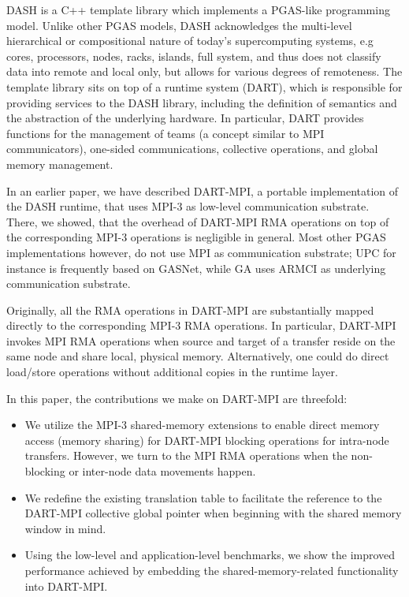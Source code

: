 \documentclass{llncs}
\newcommand{\MPI}[1]{\mbox{MPI-#1}\xspace}
\begin{document}
DASH\cite{dash} is a C++ template library which implements a PGAS-like
programming model. Unlike other PGAS models, DASH acknowledges the
multi-level hierarchical or compositional nature of today's     
supercomputing systems, e.g cores, processors, nodes, racks, islands,
full system, and thus does not classify data into remote and local
only, but allows for various degrees of remoteness. The template
library sits on top of a runtime system (DART), which is responsible
for providing services to the DASH library, including the definition
of semantics and the abstraction of the underlying hardware. In
particular, DART provides functions for the management of teams
(a concept similar to  MPI communicators),
one-sided communications, collective operations,
and global memory management. 

In an earlier paper\cite{dart-mpi}, we have described DART-MPI, a portable
implementation of the DASH runtime, that uses \MPI3 as low-level
communication substrate. There, we showed, that the overhead of
DART-MPI RMA operations on top of the corresponding MPI-3 operations
is negligible in general. Most other PGAS
implementations however, do not use MPI as communication substrate;
UPC\cite{upc} for instance is frequently based on
GASNet\cite{techgasnet}, while GA\cite{ga} uses ARMCI\cite{armci} as
underlying communication substrate.

Originally, all the RMA operations in DART-MPI are substantially mapped
directly to the corresponding \MPI3 RMA operations. In particular,
DART-MPI invokes MPI RMA operations when source and target of a
transfer reside on the same node and share local,
physical memory. Alternatively, one could do direct load/store
operations without additional copies in the runtime layer. 
\iffalse
In fact, a
performance evaluation in the previous paper \cite{dart-mpi} showed
that DART-MPI performance does not increase substantially if data is
transferred within the same node or even NUMA domain.
\fi
In this paper, the contributions we make on \mbox{DART-MPI} are threefold:
\begin{itemize}
  \item We utilize the \MPI3 shared-memory extensions to 
    enable direct memory access (memory sharing)
     for \mbox{DART-MPI} blocking operations for intra-node transfers. 
    However, we turn to 
    the MPI RMA operations when the non-blocking or inter-node data movements happen.
\item We redefine the existing translation table to facilitate the reference to the DART-MPI
collective global pointer
when beginning with the shared memory window in mind.
\item Using the low-level and application-level benchmarks, we show the improved performance
achieved by embedding the shared-memory-related functionality into \mbox{DART-MPI}.
\end{itemize}
\end{document}
